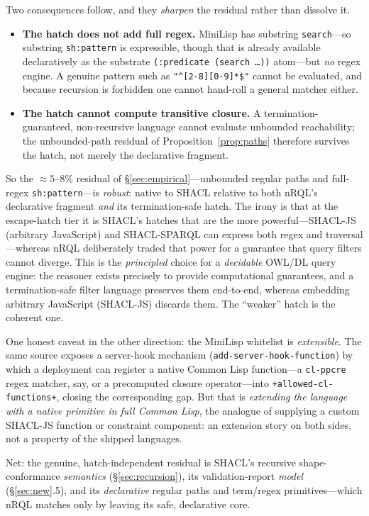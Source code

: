 \documentclass[11pt,letterpaper]{article}
\theoremstyle{definition}
\newcommand{\nrql}{nRQL}
\newcommand{\shacl}{SHACL}
\newcommand{\owl}{OWL}
\begin{document}
Two consequences follow, and they \emph{sharpen} the residual rather than dissolve it.
\begin{itemize}[leftmargin=2em]
  \item \textbf{The hatch does not add full regex.} MiniLisp has substring \texttt{search}---so substring \texttt{sh:pattern} is expressible, though that is already available declaratively as the substrate \texttt{(:predicate (search \dots))} atom---but \emph{no} regex engine. A genuine pattern such as \texttt{"\^{}[2-8][0-9]*\$"} cannot be evaluated, and because recursion is forbidden one cannot hand-roll a general matcher either.
  \item \textbf{The hatch cannot compute transitive closure.} A termination-guaranteed, non-recursive language cannot evaluate unbounded reachability; the unbounded-path residual of Proposition~\ref{prop:paths} therefore survives the hatch, not merely the declarative fragment.
\end{itemize}
So the $\approx 5$--$8\%$ residual of \S\ref{sec:empirical}---unbounded regular paths and full-regex \texttt{sh:pattern}---is \emph{robust}: native to \shacl{} relative to both \nrql{}'s declarative fragment \emph{and} its termination-safe hatch. The irony is that at the escape-hatch tier it is \shacl{}'s hatches that are the more powerful---\shacl{}-JS (arbitrary JavaScript) and \shacl{}-SPARQL can express both regex and traversal---whereas \nrql{} deliberately traded that power for a guarantee that query filters cannot diverge. This is the \emph{principled} choice for a \emph{decidable} \owl{}/DL query engine: the reasoner exists precisely to provide computational guarantees, and a termination-safe filter language preserves them end-to-end, whereas embedding arbitrary JavaScript (\shacl{}-JS) discards them. The ``weaker'' hatch is the coherent one.

One honest caveat in the other direction: the MiniLisp whitelist is \emph{extensible}. The same source exposes a server-hook mechanism (\texttt{add-server-hook-function}) by which a deployment can register a native Common Lisp function---a \texttt{cl-ppcre} regex matcher, say, or a precomputed closure operator---into \texttt{+allowed-cl-functions+}, closing the corresponding gap. But that is \emph{extending the language with a native primitive in full Common Lisp}, the analogue of supplying a custom \shacl{}-JS function or constraint component: an extension story on both sides, not a property of the shipped languages.

Net: the genuine, hatch-independent residual is \shacl{}'s recursive shape-conformance \emph{semantics} (\S\ref{sec:recursion}), its validation-report \emph{model} (\S\ref{sec:new}.5), and its \emph{declarative} regular paths and term/regex primitives---which \nrql{} matches only by leaving its safe, declarative core.
\end{document}
